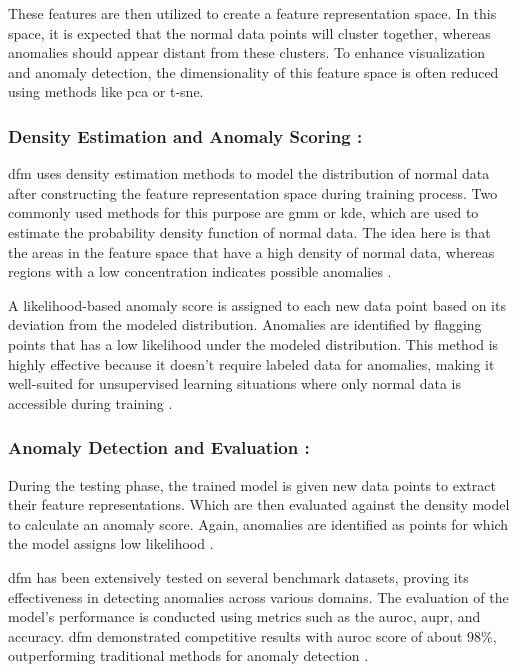 These features are then utilized to create a feature representation space. In this space, it is expected that the normal data points will cluster together, whereas anomalies should appear distant from these clusters. To enhance visualization and anomaly detection\cite{ahuja2019probabilisticmodelingdeepfeatures}, the dimensionality of this feature space is often reduced using methods like \gls{pca}\cite{Bishop2006} or \gls{t-sne}\cite{JMLR:v9:vandermaaten08a}.

\subsubsection*{Density Estimation and Anomaly Scoring :}

\gls{dfm} uses density estimation methods to model the distribution of normal data after constructing the feature representation space during training process. Two commonly used methods for this purpose are \gls{gmm} or \gls{kde}, which are used to estimate the probability density function of normal data. The idea here is that the areas in the feature space that have a high density of normal data, whereas regions with a low concentration indicates possible anomalies \cite{ahuja2019probabilisticmodelingdeepfeatures}.

A likelihood-based anomaly score is assigned to each new data point based on its deviation from the modeled distribution. Anomalies are identified by flagging points that has a low likelihood under the modeled distribution. This method is highly effective because it doesn't require labeled data for anomalies, making it well-suited for unsupervised learning situations where only normal data is accessible during training \cite{ahuja2019probabilisticmodelingdeepfeatures}.

\subsubsection*{Anomaly Detection and Evaluation :}

During the testing phase, the trained model is given new data points to extract their feature representations. Which are then evaluated against the density model to calculate an anomaly score. Again, anomalies are identified as points for which the model assigns low likelihood \cite{ahuja2019probabilisticmodelingdeepfeatures}.

\gls{dfm} has been extensively tested on several benchmark datasets, proving its effectiveness in detecting anomalies across various domains. The evaluation of the model's performance is conducted using metrics such as the \gls{auroc}, \gls{aupr}, and accuracy. \gls{dfm} demonstrated competitive results with \gls{auroc} score of about 98\%, outperforming traditional methods for anomaly detection \cite{ahuja2019probabilisticmodelingdeepfeatures}. 

